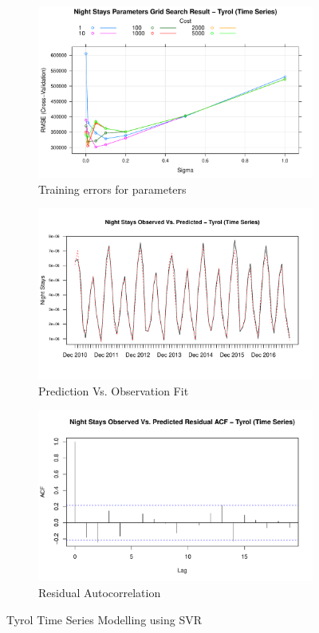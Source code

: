 \documentclass[a4paper,reqno,]{article}
\begin{document}
\begin{figure}[h!]
  \centering
  \begin{subfigure}[b]{0.32\linewidth}
    \includegraphics[width=\linewidth]{images/SVR/TyrolGrid.pdf}
    \caption{Training errors for parameters}
  \end{subfigure}
  \begin{subfigure}[b]{0.32\linewidth}
    \includegraphics[width=\linewidth]{images/SVR/TyrolTimeSeries.pdf}
    \caption{Prediction Vs. Observation Fit}
  \end{subfigure}
  \begin{subfigure}[b]{0.32\linewidth}
    \includegraphics[width=\linewidth]{images/SVR/TyrolACF.pdf}
    \caption{Residual Autocorrelation}
  \end{subfigure}
  \caption{Tyrol Time Series Modelling using SVR}
  \label{fig:Time Series}
\end{figure}
\end{document}
